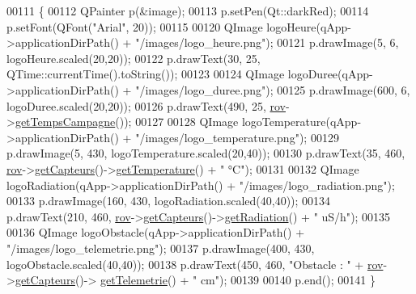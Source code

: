 \begin{DoxyCode}
00111 \{
00112     QPainter p(&image);
00113     p.setPen(Qt::darkRed);
00114     p.setFont(QFont(\textcolor{stringliteral}{"Arial"}, 20));
00115 
00120     QImage logoHeure(qApp->applicationDirPath() + \textcolor{stringliteral}{"/images/logo\_heure.png"});
00121     p.drawImage(5, 6, logoHeure.scaled(20,20));
00122     p.drawText(30, 25, QTime::currentTime().toString());
00123 
00124     QImage logoDuree(qApp->applicationDirPath() + \textcolor{stringliteral}{"/images/logo\_duree.png"});
00125     p.drawImage(600, 6, logoDuree.scaled(20,20));
00126     p.drawText(490, 25, \hyperlink{class_i_h_m_rov_a777ca33fdb295ba6b6773e880356fa1e}{rov}->\hyperlink{class_rov_aa977585d4377a57281004fd57208635a}{getTempsCampagne}());
00127 
00128     QImage logoTemperature(qApp->applicationDirPath() + \textcolor{stringliteral}{"/images/logo\_temperature.png"});
00129     p.drawImage(5, 430, logoTemperature.scaled(20,40));
00130     p.drawText(35, 460, \hyperlink{class_i_h_m_rov_a777ca33fdb295ba6b6773e880356fa1e}{rov}->\hyperlink{class_rov_a7e231245b39e7cc8026324e337b34c64}{getCapteurs}()->\hyperlink{class_capteurs_aa1346e5cbea9e37afc3694a0ea86bd99}{getTemperature}() + \textcolor{stringliteral}{" °C"});
00131 
00132     QImage logoRadiation(qApp->applicationDirPath() + \textcolor{stringliteral}{"/images/logo\_radiation.png"});
00133     p.drawImage(160, 430, logoRadiation.scaled(40,40));
00134     p.drawText(210, 460, \hyperlink{class_i_h_m_rov_a777ca33fdb295ba6b6773e880356fa1e}{rov}->\hyperlink{class_rov_a7e231245b39e7cc8026324e337b34c64}{getCapteurs}()->\hyperlink{class_capteurs_aaee3d64c752b09f8674fa62907f38cbc}{getRadiation}() + \textcolor{stringliteral}{" uS/h"});
00135 
00136     QImage logoObstacle(qApp->applicationDirPath() + \textcolor{stringliteral}{"/images/logo\_telemetrie.png"});
00137     p.drawImage(400, 430, logoObstacle.scaled(40,40));
00138     p.drawText(450, 460, \textcolor{stringliteral}{"Obstacle : "} + \hyperlink{class_i_h_m_rov_a777ca33fdb295ba6b6773e880356fa1e}{rov}->\hyperlink{class_rov_a7e231245b39e7cc8026324e337b34c64}{getCapteurs}()->
      \hyperlink{class_capteurs_ad8c2c486e92cc537dc014035b5634b60}{getTelemetrie}() + \textcolor{stringliteral}{" cm"});
00139 
00140     p.end();
00141 \}
\end{DoxyCode}
\mbox{\label{class_i_h_m_rov_ae6e1c32c5dea20eb835f5c9036de8a5b}} 
